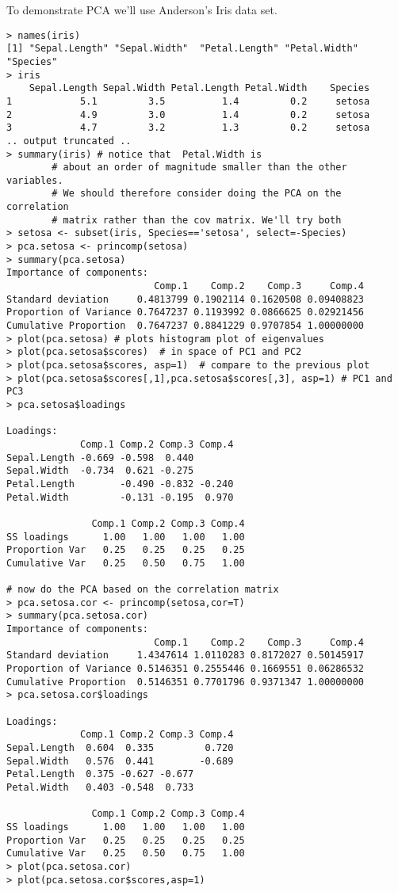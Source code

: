 \documentclass{article}
\begin{document}
To demonstrate PCA we'll use Anderson's Iris data set.

\begin{lstlisting}
> names(iris)
[1] "Sepal.Length" "Sepal.Width"  "Petal.Length" "Petal.Width"  "Species"     
> iris
    Sepal.Length Sepal.Width Petal.Length Petal.Width    Species
1            5.1         3.5          1.4         0.2     setosa
2            4.9         3.0          1.4         0.2     setosa
3            4.7         3.2          1.3         0.2     setosa    
.. output truncated ..
> summary(iris) # notice that  Petal.Width is
        # about an order of magnitude smaller than the other variables.
        # We should therefore consider doing the PCA on the correlation
        # matrix rather than the cov matrix. We'll try both
> setosa <- subset(iris, Species=='setosa', select=-Species)        
> pca.setosa <- princomp(setosa)
> summary(pca.setosa)
Importance of components:
                          Comp.1    Comp.2    Comp.3     Comp.4
Standard deviation     0.4813799 0.1902114 0.1620508 0.09408823
Proportion of Variance 0.7647237 0.1193992 0.0866625 0.02921456
Cumulative Proportion  0.7647237 0.8841229 0.9707854 1.00000000
> plot(pca.setosa) # plots histogram plot of eigenvalues
> plot(pca.setosa$scores)  # in space of PC1 and PC2
> plot(pca.setosa$scores, asp=1)  # compare to the previous plot     
> plot(pca.setosa$scores[,1],pca.setosa$scores[,3], asp=1) # PC1 and PC3
> pca.setosa$loadings

Loadings:
             Comp.1 Comp.2 Comp.3 Comp.4
Sepal.Length -0.669 -0.598  0.440       
Sepal.Width  -0.734  0.621 -0.275       
Petal.Length        -0.490 -0.832 -0.240
Petal.Width         -0.131 -0.195  0.970

               Comp.1 Comp.2 Comp.3 Comp.4
SS loadings      1.00   1.00   1.00   1.00
Proportion Var   0.25   0.25   0.25   0.25
Cumulative Var   0.25   0.50   0.75   1.00

# now do the PCA based on the correlation matrix
> pca.setosa.cor <- princomp(setosa,cor=T)
> summary(pca.setosa.cor)
Importance of components:
                          Comp.1    Comp.2    Comp.3     Comp.4
Standard deviation     1.4347614 1.0110283 0.8172027 0.50145917
Proportion of Variance 0.5146351 0.2555446 0.1669551 0.06286532
Cumulative Proportion  0.5146351 0.7701796 0.9371347 1.00000000
> pca.setosa.cor$loadings

Loadings:
             Comp.1 Comp.2 Comp.3 Comp.4
Sepal.Length  0.604  0.335         0.720
Sepal.Width   0.576  0.441        -0.689
Petal.Length  0.375 -0.627 -0.677       
Petal.Width   0.403 -0.548  0.733       

               Comp.1 Comp.2 Comp.3 Comp.4
SS loadings      1.00   1.00   1.00   1.00
Proportion Var   0.25   0.25   0.25   0.25
Cumulative Var   0.25   0.50   0.75   1.00
> plot(pca.setosa.cor)
> plot(pca.setosa.cor$scores,asp=1)
\end{lstlisting}
\end{document}
